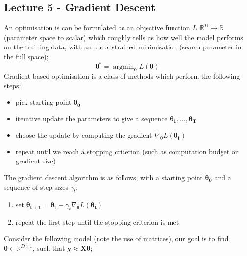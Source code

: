 \documentclass[a4paper, 12pt]{article}
\newcommand{\mat}[1]{\boldsymbol{#1}}
\renewcommand{\vec}[1]{\boldsymbol{#1}}
\DeclareMathOperator*{\argmin}{argmin}
\newcommand{\mbbr}[0]{\mathbb{R}}
\begin{document}
        \subsection*{Lecture 5 - Gradient Descent}
            An optimisation is can be formulated as an objective function $L : \mbbr^D \to \mbbr$ (parameter space to scalar) which roughly tells us how well the model performs on the training data, with an unconstrained minimisation (search parameter in the full space);
            $$\vec{\theta^*} = \argmin_{\vec{\theta}} L(\vec{\theta})$$
            Gradient-based optimisation is a class of methods which perform the following steps;
            \begin{itemize}
                \itemsep0em
                \item pick starting point $\vec{\theta_0}$
                \item iterative update the parameters to give a sequence $\vec{\theta_1}, \dots, \vec{\theta_T}$
                \item choose the update by computing the gradient $\nabla_{\vec\theta}L(\vec{\theta_t})$
                \item repeat until we reach a stopping criterion (such as computation budget or gradient size)
            \end{itemize}
            The gradient descent algorithm is as follows, with a starting point $\vec{\theta_0}$ and a sequence of step sizes $\gamma_t$;
            \begin{enumerate}[1.]
                \itemsep0em
                \item set $\vec{\theta_{t + 1}} = \vec{\theta_t} - \gamma_t \nabla_{\vec{\theta}}L(\vec{\theta_t})$
                \item repeat the first step until the stopping criterion is met
            \end{enumerate}
            Consider the following model (note the use of matrices), our goal is to find $\mat{\theta} \in \mbbr^{D \times 1}$, such that $\mat{y} \approx \mat{X}\mat{\theta}$;
\end{document}
